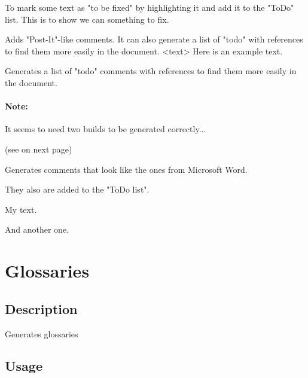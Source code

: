 {
    To mark some text as "to be fixed" by highlighting it and add it to the
    "ToDo" list.
}
{
}
{
    This is to show we can 
    something to fix.
}



{
    Adds "Post-It"-like comments. It can also generate a list of "todo" with
    references to find them more easily in the document.
}
{
    <text>
}
{
    Here is an example text.
}



{
    Generates a list of "todo" comments with references to find them more easily
    in the document.
    \paragraph{Note:} It seems to need two builds to be generated correctly...
}
{
    \listoftodos
}
{
    (see on next page)
    \listoftodos
}



{
    Generates comments that look like the ones from Microsoft Word.

    They also are added to the "ToDo list".
}
{
}
{
    My  text.

    And  another one.
}



\section{
    Glossaries
}

    \subsection{Description}
    Generates glossaries

    \subsection{Usage}

